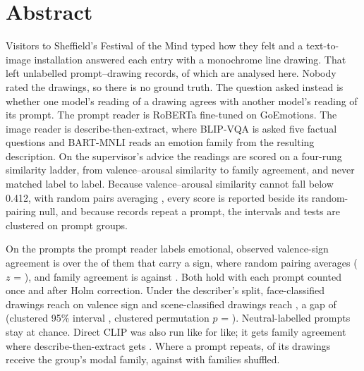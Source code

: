 \chapter*{\Large \center Abstract}

Visitors to Sheffield's Festival of the Mind typed how they felt and a text-to-image installation answered each entry with a monochrome line drawing. That left \nTotal{} unlabelled prompt--drawing records, of which \nAnalysed{} are analysed here. Nobody rated the drawings, so there is no ground truth. The question asked instead is whether one model's reading of a drawing agrees with another model's reading of its prompt. The prompt reader is RoBERTa fine-tuned on GoEmotions. The image reader is describe-then-extract, where BLIP-VQA is asked five factual questions and BART-MNLI reads an emotion family from the resulting description. On the supervisor's advice the readings are scored on a four-rung similarity ladder, from valence--arousal similarity to family agreement, and never matched label to label. Because valence--arousal similarity cannot fall below 0.412, with random pairs averaging \FullNeuVaNull{}, every score is reported beside its random-pairing null, and because \nRepeats{} records repeat a prompt, the intervals and tests are clustered on prompt groups.

On the \nEmotional{} prompts the prompt reader labels emotional, observed valence-sign agreement is \FullEmoSignObs{} over the \FullEmoNSign{} of them that carry a sign, where random pairing averages \FullEmoSignNull{} ($z$ = \FullEmoSignZ{}), and family agreement is \FullEmoFamObs{} against \FullEmoFamNull{}. Both hold with each prompt counted once and after Holm correction. Under the describer's split, face-classified drawings reach \FullFaceSignObs{} on valence sign and scene-classified drawings reach \FullSceneSignObs{}, a gap of \DiffSignPp{} (clustered 95\% interval \DiffSignCi{}, clustered permutation $p$ = \DiffSignP{}). Neutral-labelled prompts stay at chance. Direct CLIP was also run like for like; it gets \McClipFam{} family agreement where describe-then-extract gets \McDeFam{}. Where a prompt repeats, \ConsFam{} of its drawings receive the group's modal family, against \ConsFamNull{} with families shuffled.

